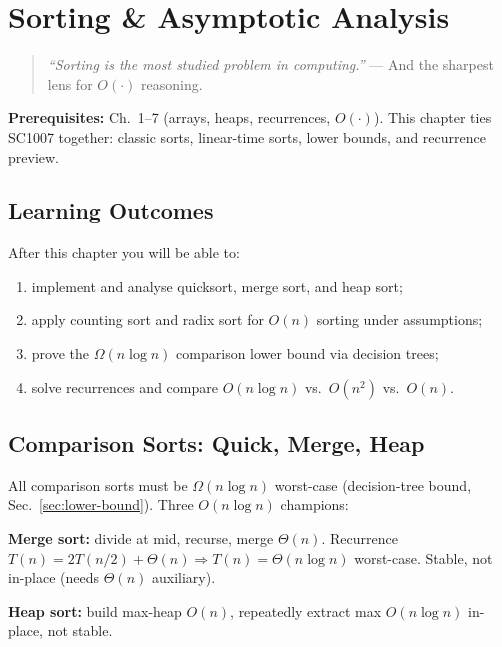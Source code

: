 \chapter{Sorting \& Asymptotic Analysis}
\label{ch:graphs-sorting}

\begin{quote}
\emph{``Sorting is the most studied problem in computing.''} --- And the sharpest lens for $O(\cdot)$ reasoning.
\end{quote}

\noindent\textbf{Prerequisites:} Ch.~1--7 (arrays, heaps, recurrences, $O(\cdot)$). This chapter ties SC1007 together: classic sorts, linear-time sorts, lower bounds, and recurrence preview.

\section*{Learning Outcomes}
After this chapter you will be able to:
\begin{enumerate}[label=(L\arabic*)]
    \item implement and analyse quicksort, merge sort, and heap sort;
    \item apply counting sort and radix sort for $O(n)$ sorting under assumptions;
    \item prove the $\Omega(n\log n)$ comparison lower bound via decision trees;
    \item solve recurrences and compare $O(n\log n)$ vs.\ $O(n^{2})$ vs.\ $O(n)$.
\end{enumerate}

\section{Comparison Sorts: Quick, Merge, Heap}
\label{sec:comparison-sorts}
All comparison sorts must be $\Omega(n\log n)$ worst-case (decision-tree bound, Sec.~\ref{sec:lower-bound}). Three $O(n\log n)$ champions:

\textbf{Merge sort:} divide at mid, recurse, merge $\Theta(n)$. Recurrence $T(n)=2T(n/2)+\Theta(n)\Rightarrow T(n)=\Theta(n\log n)$ worst-case. Stable, not in-place (needs $\Theta(n)$ auxiliary).

\textbf{Heap sort:} build max-heap $O(n)$, repeatedly extract max $O(n\log n)$ in-place, not stable.

